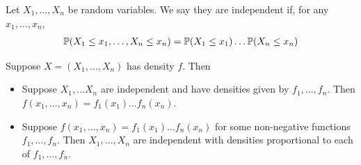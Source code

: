 \documentclass{../template/note}
\begin{document}
    \begin{definition}[Independence]
        Let \(X_1, \dots, X_n\) be random variables. We say they are independent if, for any \(x_1, \dots, x_n\),
        \begin{align*}
            \mathbb P(X_1 \leq x_1, \dots, X_n \leq x_n) = \mathbb P(X_1 \leq x_1) \dots \mathbb P(X_n \leq x_n)
        \end{align*}
    \end{definition}
    
    \begin{proposition}
        Suppose \(X = (X_1, \dots, X_n)\) has density \(f\). Then
        \begin{itemize}
            \item Suppose \(X_1, \dots X_n\) are independent and have densities given by \(f_1, \dots, f_n\). Then \(f(x_1, \dots, x_n) = f_1(x_1) \dots f_n(x_n)\).
            \item Suppose \(f(x_1, \dots, x_n) = f_1(x_1) \dots f_n(x_n)\) for some non-negative functions \(f_1, \dots, f_n\). Then \(X_1, \dots, X_n\) are independent with densities proportional to each of \(f_1, \dots, f_n\).
        \end{itemize}
    \end{proposition}
    
\end{document}
